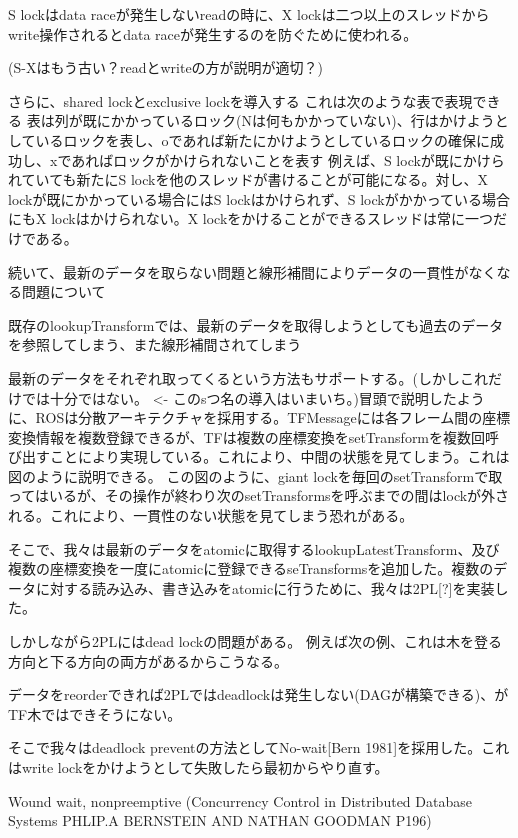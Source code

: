 \documentclass{jarticle}
\begin{document}
\begin{multicols}{2}
S lockはdata raceが発生しないreadの時に、X lockは二つ以上のスレッドからwrite操作されるとdata raceが発生するのを防ぐために使われる。

(S-Xはもう古い？readとwriteの方が説明が適切？)


さらに、shared lockとexclusive lockを導入する
これは次のような表で表現できる
%
表は列が既にかかっているロック(Nは何もかかっていない)、行はかけようとしているロックを表し、oであれば新たにかけようとしているロックの確保に成功し、xであればロックがかけられないことを表す
例えば、S lockが既にかけられていても新たにS lockを他のスレッドが書けることが可能になる。対し、X lockが既にかかっている場合にはS lockはかけられず、S lockがかかっている場合にもX lockはかけられない。X lockをかけることができるスレッドは常に一つだけである。


続いて、最新のデータを取らない問題と線形補間によりデータの一貫性がなくなる問題について

既存のlookupTransformでは、最新のデータを取得しようとしても過去のデータを参照してしまう、また線形補間されてしまう

最新のデータをそれぞれ取ってくるという方法もサポートする。(しかしこれだけでは十分ではない。 <- このsつ名の導入はいまいち。)冒頭で説明したように、ROSは分散アーキテクチャを採用する。TFMessageには各フレーム間の座標変換情報を複数登録できるが、TFは複数の座標変換をsetTransformを複数回呼び出すことにより実現している。これにより、中間の状態を見てしまう。これは図のように説明できる。
この図のように、giant lockを毎回のsetTransformで取ってはいるが、その操作が終わり次のsetTransformsを呼ぶまでの間はlockが外される。これにより、一貫性のない状態を見てしまう恐れがある。


そこで、我々は最新のデータをatomicに取得するlookupLatestTransform、及び複数の座標変換を一度にatomicに登録できるseTransformsを追加した。複数のデータに対する読み込み、書き込みをatomicに行うために、我々は2PL[?]を実装した。

しかしながら2PLにはdead lockの問題がある。
例えば次の例、これは木を登る方向と下る方向の両方があるからこうなる。

データをreorderできれば2PLではdeadlockは発生しない(DAGが構築できる)、がTF木ではできそうにない。

そこで我々はdeadlock preventの方法としてNo-wait[Bern 1981]を採用した。これはwrite lockをかけようとして失敗したら最初からやり直す。

Wound wait, nonpreemptive (Concurrency Control in Distributed Database Systems PHLIP.A BERNSTEIN AND NATHAN GOODMAN P196)


\end{multicols}
\end{document}
